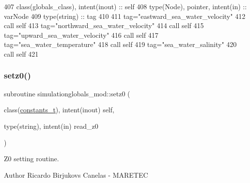 \begin{DoxyCode}
407     \textcolor{keywordtype}{class}(globals\_class), \textcolor{keywordtype}{intent(inout)} :: self
408     \textcolor{keywordtype}{type}(Node), \textcolor{keywordtype}{pointer}, \textcolor{keywordtype}{intent(in)} :: varNode
409     \textcolor{keywordtype}{type}(string) :: tag
410 
411     tag=\textcolor{stringliteral}{"eastward\_sea\_water\_velocity"}
412     \textcolor{keyword}{call }self%
413     tag=\textcolor{stringliteral}{"northward\_sea\_water\_velocity"}
414     \textcolor{keyword}{call }self%
415     tag=\textcolor{stringliteral}{"upward\_sea\_water\_velocity"}
416     \textcolor{keyword}{call }self%
417     tag=\textcolor{stringliteral}{"sea\_water\_temperature"}
418     \textcolor{keyword}{call }self%
419     tag=\textcolor{stringliteral}{"sea\_water\_salinity"}
420     \textcolor{keyword}{call }self%
421 
\end{DoxyCode}
\mbox{\label{namespacesimulationglobals__mod_a36c2833caae3767434115cc966fe2c5d}} 
\subsubsection{\texorpdfstring{setz0()}{setz0()}}
{\footnotesize\ttfamily subroutine simulationglobals\+\_\+mod\+::setz0 (\begin{DoxyParamCaption}\item[{class(\mbox{\hyperlink{structsimulationglobals__mod_1_1constants__t}{constants\+\_\+t}}), intent(inout)}]{self,  }\item[{type(string), intent(in)}]{read\+\_\+z0 }\end{DoxyParamCaption})\hspace{0.3cm}{\ttfamily [private]}}



Z0 setting routine. 

\begin{DoxyAuthor}{Author}
Ricardo Birjukovs Canelas -\/ M\+A\+R\+E\+T\+EC 
\end{DoxyAuthor}

